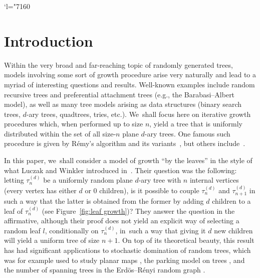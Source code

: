 \documentclass[JEP,XML,SOM,Unicode,NoFloatCountersInSection, NoEqCountersInSection,published]{cedram}
\newcommand{\Changel}{\mathcode`l="7160}
\theoremstyle{definition}
\begin{document}
\Changel
\section{Introduction}

Within the very broad and far-reaching topic of randomly generated trees, models involving some sort of growth procedure arise very naturally and lead to a myriad of interesting questions and results. Well-known examples include random recursive trees and preferential attachment trees (e.g., the Barabasi--Albert model), as well as many tree models arising as data structures (binary search trees, $d$-ary trees, quadtrees, tries, etc.). We~shall focus here on iterative growth procedures which, when performed up to size $n$, yield a tree that is uniformly distributed within the set of all size-$n$ plane $d$-ary trees. One famous such procedure is given by Rémy's algorithm and its variants~\cite{Rem85,Mar03,HS14}, but others include~\cite{marckert2023growing}.

In this paper, we~shall consider a model of growth ``by the leaves'' in the style of what Luczak and Winkler introduced in~\cite{LW04}. Their question was the following: letting $\tau^{(d)}_n$ be a uniformly random plane $d$-ary tree with $n$ internal vertices (every vertex has either $d$ or $0$ children), is it possible to couple $\tau^{(d)}_n$ and $\tau^{(d)}_{n+1}$ in such a way that the latter is obtained from the former by adding $d$ children to a leaf of $\tau^{(d)}_n$ (see Figure~\ref{fig:leaf growth})? They answer the question in the affirmative, although their proof does not yield an explicit way of selecting a random leaf $l$, conditionally on $\tau^{(d)}_n$, in~such a way that giving it $d$ new children will yield a uniform tree of size $n+1$. On top of its theoretical beauty, this result has had significant applications to stochastic domination of random trees, which was for example used to study planar maps \cite{addario2014growing, CS23}, the parking model on trees \cite{goldschmidt2019parking}, and the number of spanning trees in the Erd\"os--Rényi random graph \cite{lyons2008growth}.
\end{document}
